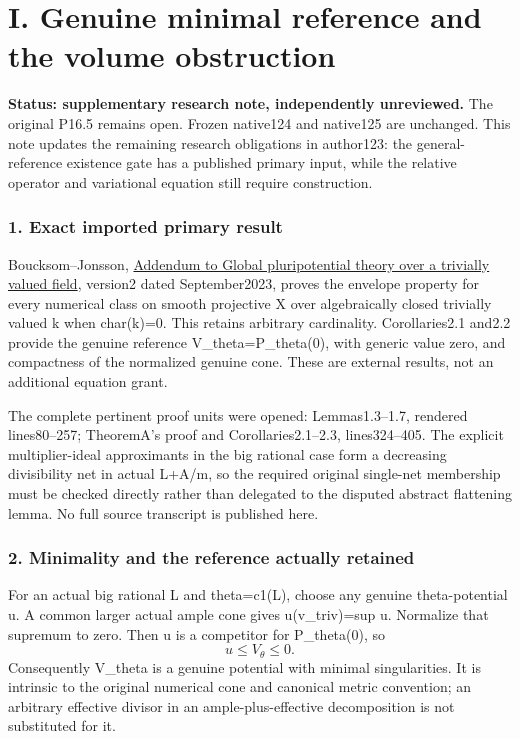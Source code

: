 \documentclass[
  10pt,
]{article}
\begin{document}
\section{I. Genuine minimal reference and the volume
obstruction}\label{i.-genuine-minimal-reference-and-the-volume-obstruction}

\textbf{Status: supplementary research note, independently unreviewed.}
The original P16.5 remains open. Frozen native124 and native125 are
unchanged. This note updates the remaining research obligations in
author123: the general-reference existence gate has a published primary
input, while the relative operator and variational equation still
require construction.

\subsubsection{1. Exact imported primary
result}\label{exact-imported-primary-result}

Boucksom--Jonsson, \href{https://arxiv.org/pdf/2206.07183v2}{Addendum to
Global pluripotential theory over a trivially valued field}, version2
dated September2023, proves the envelope property for every numerical
class on smooth projective X over algebraically closed trivially valued
k when char(k)=0. This retains arbitrary cardinality. Corollaries2.1
and2.2 provide the genuine reference V\_theta=P\_theta(0), with generic
value zero, and compactness of the normalized genuine cone. These are
external results, not an additional equation grant.

The complete pertinent proof units were opened: Lemmas1.3--1.7, rendered
lines80--257; TheoremA's proof and Corollaries2.1--2.3, lines324--405.
The explicit multiplier-ideal approximants in the big rational case form
a decreasing divisibility net in actual L+A/m, so the required original
single-net membership must be checked directly rather than delegated to
the disputed abstract flattening lemma. No full source transcript is
published here.

\subsubsection{2. Minimality and the reference actually
retained}\label{minimality-and-the-reference-actually-retained}

For an actual big rational L and theta=c1(L), choose any genuine
theta-potential u. A common larger actual ample cone gives
u(v\_triv)=sup u. Normalize that supremum to zero. Then u is a
competitor for P\_theta(0), so \[
 u\le V_\theta\le0.
\] Consequently V\_theta is a genuine potential with minimal
singularities. It is intrinsic to the original numerical cone and
canonical metric convention; an arbitrary effective divisor in an
ample-plus-effective decomposition is not substituted for it.
\end{document}
